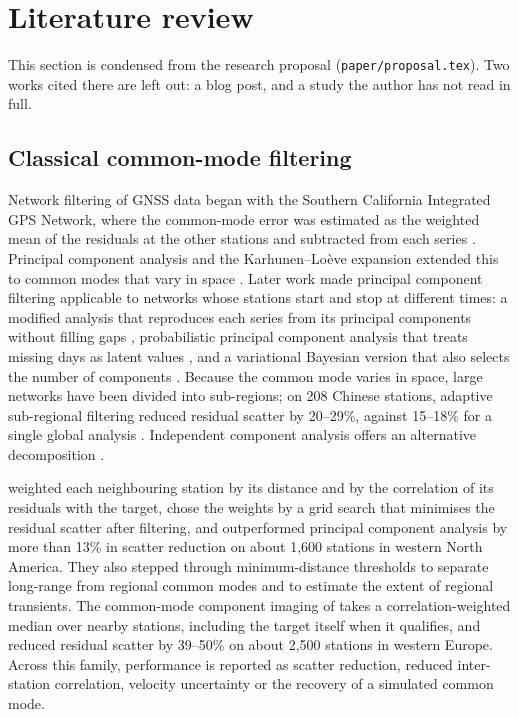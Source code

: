 \section{Literature review}
\label{sec:literature}

This section is condensed from the research proposal (\texttt{paper/proposal.tex}). Two works cited there are left out: a blog post, and a study the author has not read in full.

\subsection{Classical common-mode filtering}

Network filtering of GNSS data began with the Southern California Integrated GPS Network, where the common-mode error was estimated as the weighted mean of the residuals at the other stations and subtracted from each series \citep{wdowinski1997}. Principal component analysis and the Karhunen--Lo\`eve expansion extended this to common modes that vary in space \citep{dong2006}. Later work made principal component filtering applicable to networks whose stations start and stop at different times: a modified analysis that reproduces each series from its principal components without filling gaps \citep{shen2014}, probabilistic principal component analysis that treats missing days as latent values \citep{gruszczynski2018}, and a variational Bayesian version that also selects the number of components \citep{li2020vbpca}. Because the common mode varies in space, large networks have been divided into sub-regions; on 208 Chinese stations, adaptive sub-regional filtering reduced residual scatter by 20--29\%, against 15--18\% for a single global analysis \citep{liu2026}. Independent component analysis offers an alternative decomposition \citep{gualandi2016, zhou2022}.

\citet{tianshen2016} weighted each neighbouring station by its distance and by the correlation of its residuals with the target, chose the weights by a grid search that minimises the residual scatter after filtering, and outperformed principal component analysis by more than 13\% in scatter reduction on about 1,600 stations in western North America. They also stepped through minimum-distance thresholds to separate long-range from regional common modes and to estimate the extent of regional transients. The common-mode component imaging of \citet{kreemer2021} takes a correlation-weighted median over nearby stations, including the target itself when it qualifies, and reduced residual scatter by 39--50\% on about 2,500 stations in western Europe. Across this family, performance is reported as scatter reduction, reduced inter-station correlation, velocity uncertainty or the recovery of a simulated common mode.

